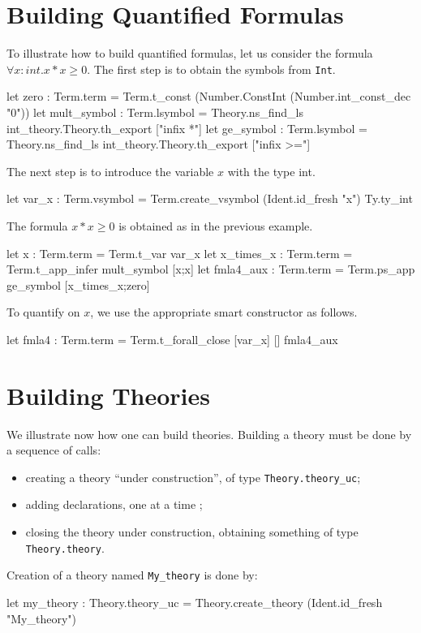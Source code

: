 \section{Building Quantified Formulas}

To illustrate how to build quantified formulas, let us consider
the formula $\forall x:int. x*x \geq 0$. The first step is to
obtain the symbols from \texttt{Int}.
\begin{ocamlcode}
let zero : Term.term = 
  Term.t_const (Number.ConstInt (Number.int_const_dec "0"))
let mult_symbol : Term.lsymbol =
  Theory.ns_find_ls int_theory.Theory.th_export ["infix *"]
let ge_symbol : Term.lsymbol =
  Theory.ns_find_ls int_theory.Theory.th_export ["infix >="]
\end{ocamlcode}
The next step is to introduce the variable $x$ with the type int.
\begin{ocamlcode}
let var_x : Term.vsymbol =
  Term.create_vsymbol (Ident.id_fresh "x") Ty.ty_int
\end{ocamlcode}
The formula $x*x \geq 0$ is obtained as in the previous example.
\begin{ocamlcode}
let x : Term.term = Term.t_var var_x
let x_times_x : Term.term = Term.t_app_infer mult_symbol [x;x]
let fmla4_aux : Term.term = Term.ps_app ge_symbol [x_times_x;zero]
\end{ocamlcode}
To quantify on $x$, we use the appropriate smart constructor as follows.
\begin{ocamlcode}
let fmla4 : Term.term = Term.t_forall_close [var_x] [] fmla4_aux
\end{ocamlcode}

\section{Building Theories}

We illustrate now how one can build theories. Building a theory must
be done by a sequence of calls:
\begin{itemize}
\item creating a theory ``under construction'', of type \verb|Theory.theory_uc|;
\item adding declarations, one at a time ;
\item closing the theory under construction, obtaining something of type \verb|Theory.theory|.
\end{itemize}

Creation of a theory named \verb|My_theory| is done by:
\begin{ocamlcode}
let my_theory : Theory.theory_uc = 
  Theory.create_theory (Ident.id_fresh "My_theory")
\end{ocamlcode}

